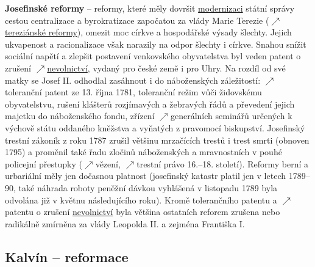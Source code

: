 \documentclass{article}
\begin{document}
  {\bf Josefinské reformy} -- reformy, které měly dovršit \hyperref[sec:modernizace]{modernizaci} státní správy cestou centralizace a byrokratizace započatou za vlády Marie Terezie ($\nearrow$\hyperref[sec:terezianskeReformy]{tereziánské reformy}), omezit moc církve a hospodářské výsady šlechty. Jejich ukvapenost a racionalizace však narazily na odpor šlechty i církve. Snahou snížit sociální napětí a zlepšit postavení venkovského obyvatelstva byl veden patent o zrušení $\nearrow$\hyperref[sec:nevolnictvi]{nevolnictví}, vydaný pro české země i pro Uhry. Na rozdíl od své matky se Josef II. odhodlal zasáhnout i do náboženských záležitostí: $\nearrow$toleranční patent ze 13. října 1781, toleranční režim vůči židovskému obyvatelstvu, rušení klášterů rozjímavých a žebravých řádů a převedení jejich majetku do náboženského fondu, zřízení $\nearrow$generálních seminářů určených k výchově státu oddaného kněžstva a vyňatých z pravomocí biskupství. Josefinský trestní zákoník z roku 1787 zrušil většinu mrzačících trestů i trest smrti (obnoven 1795) a proměnil také řadu zločinů náboženských a mravnostních v pouhé policejní přestupky ($\nearrow$vězení, $\nearrow$trestní právo 16.--18. století). Reformy berní a urbariální měly jen dočasnou platnost (josefinský katastr platil jen v letech 1789--90, také náhrada roboty peněžní dávkou vyhlášená v listopadu 1789 byla odvolána již v květnu následujícího roku). Kromě tolerančního patentu a $\nearrow$patentu o zrušení \hyperref[sec:nevolnictvi]{nevolnictví} byla většina ostatních reforem zrušena nebo radikálně zmírněna za vlády Leopolda II. a zejména Františka I.

  \subsection*{Kalvín – reformace~\cite{Hroch:}}
  \label{sec:kalvinReformace}
\end{document}
